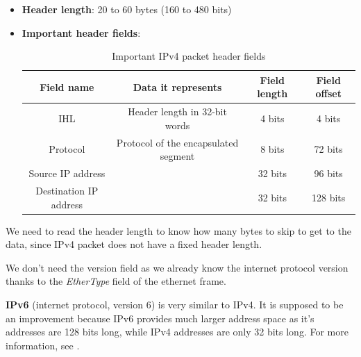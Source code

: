 \documentclass[a4paper]{article}
\begin{document}
  \begin{itemize}
    \item \textbf{Header length}: 20 to 60 bytes (160 to 480 bits)
    \item \textbf{Important header fields}:
      \begin{table}[h]
        \centering
        \begin{tabular}{|c|c|c|c|}
          \hline
          Field name & Data it represents & Field length & Field offset \\
          \hline
          \hline
          IHL & Header length in 32-bit words & 4 bits & 4 bits \\
          \hline
          Protocol & Protocol of the encapsulated segment & 8 bits & 72 bits \\
          \hline
          Source IP address & & 32 bits & 96 bits \\
          \hline
          Destination IP address & & 32 bits & 128 bits \\
          \hline
        \end{tabular}
        \caption{Important IPv4 packet header fields}
      \end{table}
  \end{itemize}

  \begin{notes}
    \item We need to read the header length to know how many bytes to skip to 
      get to the data, since IPv4 packet does not have a fixed header length.
    \item We don't need the version field as we already know the internet 
      protocol version thanks to the \textit{EtherType} field of the ethernet 
      frame.
  \end{notes}

  \vspace{1cm}


  \textbf{IPv6} (internet protocol, version 6) is very similar to IPv4. It is
  supposed to be an improvement because IPv6 provides much larger
  address space as it's addresses are 128 bits long, while IPv4 addresses 
  are only 32 bits long.
  For more information, see \cite{wikipedia:ipv6}.
\end{document}
